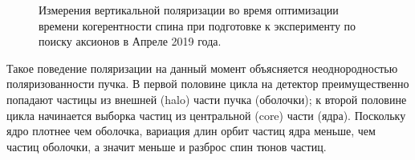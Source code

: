 \begin{figure}[h]\centering
	\caption{Измерения вертикальной поляризации во время оптимизации времени когерентности спина при подготовке к эксперименту по поиску аксионов в Апреле 2019 года.\label{fig:April2019:Polarization}}
\end{figure}

Такое поведение поляризации на данный момент объясняется неоднородностью поляризованности пучка. В первой половине цикла на детектор преимущественно попадают частицы из внешней (halo) части пучка (оболочки); к второй половине цикла начинается выборка частиц из центральной (core) части (ядра). Поскольку ядро плотнее чем оболочка, вариация длин орбит частиц ядра меньше, чем частиц оболочки, а значит меньше и разброс спин тюнов частиц.

